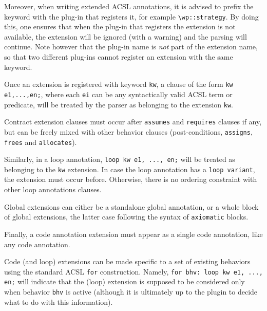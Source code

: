 Moreover, when writing extended ACSL annotations, it is advised to prefix the
keyword with the plug-in that registers it, for example
\lstinline{\wp::strategy}. By doing this, one ensures that when the plug-in that
registers the extension is not available, the extension will be ignored (with a
warning) and the parsing will continue. Note however that the plug-in name is
\emph{not} part of the extension name, so that two different plug-ins cannot
register an extension with the same keyword.

Once an extension is registered with keyword \lstinline|kw|,
a clause of the form \verb|kw e1,...,en;|,
where each \verb|ei| can be any syntactically valid ACSL term or predicate,
will be treated by the parser as belonging to the extension \verb|kw|.

Contract extension clauses must occur after \verb|assumes| and \verb|requires| clauses if any, but
can be freely mixed with other behavior clauses (post-conditions, \verb|assigns|, \verb|frees| and
\verb|allocates|).

Similarly, in a loop annotation, \verb|loop kw e1, ..., en;| will be treated as belonging to the
\verb|kw| extension. In case the loop annotation has a \verb|loop variant|, the extension must
occur before. Otherwise, there is no ordering constraint with other loop annotations clauses.

Global extensions can either be a standalone global annotation, or a whole block
of global extensions, the latter case following the syntax of
\texttt{axiomatic} blocks.

Finally, a code annotation extension must appear as a single code annotation, like any code annotation.

Code (and loop) extensions can be made specific to a
set of existing behaviors using the standard ACSL \verb|for| construction.
Namely, \verb|for bhv: loop kw e1, ..., en;| will indicate that the
(loop) extension is supposed to be considered only when behavior \verb|bhv| is
active (although it is ultimately up to the plugin to decide what to do with
this information).

